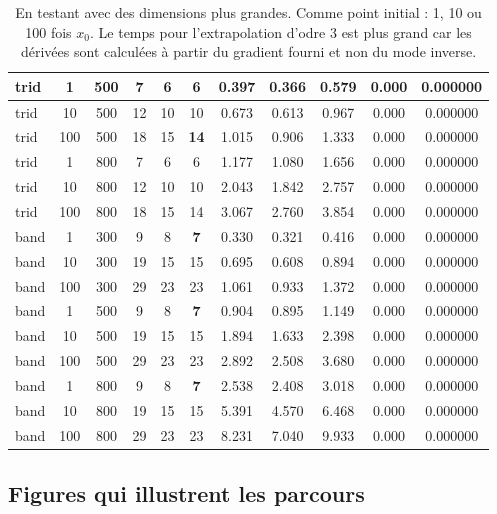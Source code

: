 \begin{table}
\begin{center}
{\begin{tabular}{|l|c|c|c|c|c|c|c|c|c|c|}
trid & 1 & 500 & 7 & 6 & 6 & 0.397 & 0.366 & 0.579 & 0.000 & 0.000000 \\\hline 
trid & 10 & 500 & 12 & 10 & 10 & 0.673 & 0.613 & 0.967 & 0.000 & 0.000000 \\\hline 
trid & 100 & 500 & 18 & 15 &{\bf 14} & 1.015 & 0.906 & 1.333 & 0.000 & 0.000000 \\\hline 
trid & 1 & 800 & 7 & 6 & 6 & 1.177 & 1.080 & 1.656 & 0.000 & 0.000000 \\\hline 
trid & 10 & 800 & 12 & 10 & 10 & 2.043 & 1.842 & 2.757 & 0.000 & 0.000000 \\\hline 
trid & 100 & 800 & 18 & 15 & 14 & 3.067 & 2.760 & 3.854 & 0.000 & 0.000000 \\\hline 
band & 1 & 300 & 9 & 8 &{\bf 7} & 0.330 & 0.321 & 0.416 & 0.000 & 0.000000 \\\hline 
band & 10 & 300 & 19 & 15 & 15 & 0.695 & 0.608 & 0.894 & 0.000 & 0.000000 \\\hline 
band & 100 & 300 & 29 & 23 & 23 & 1.061 & 0.933 & 1.372 & 0.000 & 0.000000 \\\hline 
band & 1 & 500 & 9 & 8 &{\bf 7} & 0.904 & 0.895 & 1.149 & 0.000 & 0.000000 \\\hline 
band & 10 & 500 & 19 & 15 & 15 & 1.894 & 1.633 & 2.398 & 0.000 & 0.000000 \\\hline 
band & 100 & 500 & 29 & 23 & 23 & 2.892 & 2.508 & 3.680 & 0.000 & 0.000000 \\\hline 
band & 1 & 800 & 9 & 8 &{\bf 7} & 2.538 & 2.408 & 3.018 & 0.000 & 0.000000 \\\hline 
band & 10 & 800 & 19 & 15 & 15 & 5.391 & 4.570 & 6.468 & 0.000 & 0.000000 \\\hline 
band & 100 & 800 & 29 & 23 & 23 & 8.231 & 7.040 & 9.933 & 0.000 & 0.000000 \\\hline 
\end{tabular}
}
	\end{center}
	\caption{En testant avec des dimensions plus grandes. Comme point initial : 1, 10 ou 100 fois $x_0$. Le temps pour 
l'extrapolation d'odre 3 est plus grand car les d\'eriv\'ees sont calcul\'ees \`a partir du gradient fourni et non du mode inverse.}
\label{tab:dimplus}


\end{table}

\subsection{Figures qui illustrent les parcours}


